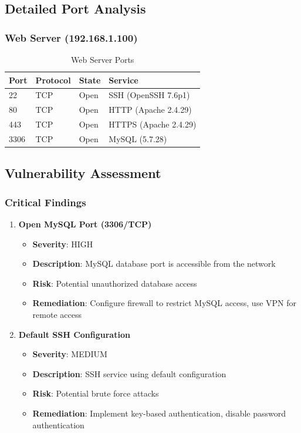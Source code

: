 \documentclass[12pt,a4paper]{report}
\begin{document}
\subsection{Detailed Port Analysis}

\subsubsection{Web Server (192.168.1.100)}

\begin{table}[H]
    \centering
    \caption{Web Server Ports}
    \label{tab:webserver_ports}
    \begin{tabular}{@{}llll@{}}
        \toprule
        Port & Protocol & State & Service \\
        \midrule
        22 & TCP & Open & SSH (OpenSSH 7.6p1) \\
        80 & TCP & Open & HTTP (Apache 2.4.29) \\
        443 & TCP & Open & HTTPS (Apache 2.4.29) \\
        3306 & TCP & Open & MySQL (5.7.28) \\
        \bottomrule
    \end{tabular}
\end{table}

\subsection{Vulnerability Assessment}

\subsubsection{Critical Findings}

\begin{enumerate}
    \item \textbf{Open MySQL Port (3306/TCP)}
    \begin{itemize}
        \item \textbf{Severity}: HIGH
        \item \textbf{Description}: MySQL database port is accessible from the network
        \item \textbf{Risk}: Potential unauthorized database access
        \item \textbf{Remediation}: Configure firewall to restrict MySQL access, use VPN for remote access
    \end{itemize}
    
    \item \textbf{Default SSH Configuration}
    \begin{itemize}
        \item \textbf{Severity}: MEDIUM
        \item \textbf{Description}: SSH service using default configuration
        \item \textbf{Risk}: Potential brute force attacks
        \item \textbf{Remediation}: Implement key-based authentication, disable password authentication
    \end{itemize}
\end{enumerate}
\end{document}
